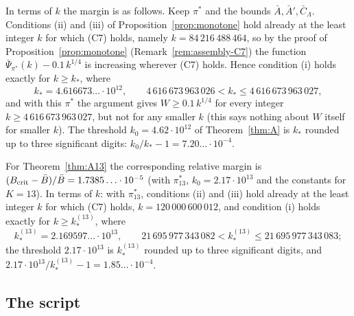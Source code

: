 \documentclass[11pt]{amsart}
\newcommand{\Lam}{\Lambda}
\theoremstyle{definition}
\theoremstyle{remark}
\numberwithin{equation}{section}
\begin{document}
In terms of $k$ the margin is as follows. Keep $\pi^*$ and the bounds $\bar A,\bar A',\bar C_\Lam$. Conditions (ii)
and (iii) of Proposition~\ref{prop:monotone} hold already at the least integer $k$ for which (C7) holds, namely
$k=84\,216\,488\,464$, so by the proof of Proposition~\ref{prop:monotone} (Remark~\ref{rem:assembly-C7}) the function
$\bar\Psi_{\pi^*}(k)-0.1\,k^{1/4}$ is increasing wherever (C7) holds. Hence condition (i) holds exactly for $k\ge k_*$, where
\[
k_*=4.616673\ldots\cdot10^{12},\qquad 4\,616\,673\,963\,026<k_*\le4\,616\,673\,963\,027 ,
\]
and with this $\pi^*$ the argument gives $W\ge0.1\,k^{1/4}$ for every integer $k\ge4\,616\,673\,963\,027$, but not
for any smaller $k$ (this says nothing about $W$ itself for smaller $k$). The threshold $k_0=4.62\cdot10^{12}$ of Theorem~\ref{thm:A} is $k_*$ rounded up to three significant digits:
$k_0/k_*-1=7.20\ldots\cdot10^{-4}$.

For Theorem~\ref{thm:A13} the corresponding relative margin is $(B_{\rm crit}-\bar B)/\bar B=1.7385\ldots\cdot10^{-5}$
(with $\pi^*_{13}$, $k_0=2.17\cdot10^{13}$ and the constants for $K=13$). In terms of $k$: with $\pi^*_{13}$, conditions
(ii) and (iii) hold already at the least integer $k$ for which (C7) holds, $k=120\,000\,600\,012$, and condition (i)
holds exactly for $k\ge k^{(13)}_*$, where
\[
k^{(13)}_*=2.169597\ldots\cdot10^{13},\qquad 21\,695\,977\,343\,082<k^{(13)}_*\le21\,695\,977\,343\,083 ;
\]
the threshold $2.17\cdot10^{13}$ is $k^{(13)}_*$ rounded up to three significant digits, and
$2.17\cdot10^{13}/k^{(13)}_*-1=1.85\ldots\cdot10^{-4}$.

\subsection{The script}\label{subsec:const-script}
\end{document}
